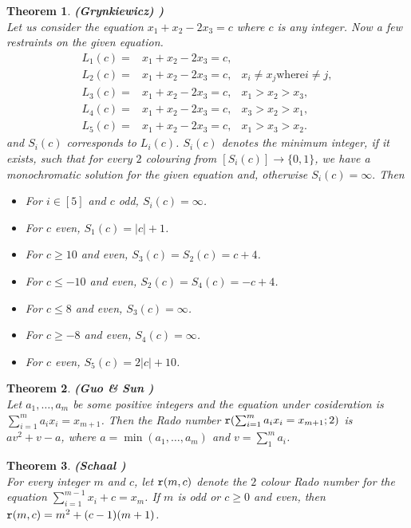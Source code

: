 \documentclass[12pt]{report}
\newtheorem{thm}{Theorem}[chapter]
\begin{document}
\begin{thm}{\bf (Grynkiewicz) {\cite{DJG}})} \\[5pt]
Let us consider the equation $x_1+x_2-2x_3=c$ where $c$ is any integer. Now a few restraints on the given equation.
\begin{eqnarray*}
L_1(c) = & x_1+x_2-2x_3=c, & \\
L_2(c) = & x_1+x_2-2x_3=c, & x_i \neq x_j \text{where} i \neq j,\\
L_3(c) = & x_1+x_2-2x_3=c, & x_1>x_2>x_3, \\
L_4(c) = & x_1+x_2-2x_3=c, & x_3>x_2>x_1, \\
L_5(c) = & x_1+x_2-2x_3=c, & x_1>x_3>x_2.
\end{eqnarray*}
and $S_i(c)$ corresponds to $L_i(c)$. $S_i(c)$ denotes the minimum integer, if it exists, such that for every $2$ colouring from $[S_i(c)]  \rightarrow  \{0,1\}$, we have a monochromatic solution for the given equation and, otherwise $S_i(c)=\infty.$ Then
\begin{itemize}
\item[{\rm (i)}]
For $i \in [5]$ and $c$ odd, $S_i(c)=\infty$.
\item[{\rm (ii)}] 
For $c$ even, $S_1(c)=|c|+1$.
\item[{\rm (iii)}]
For $c \geq 10$ and even, $S_3(c)=S_2(c)=c+4$.
\item[{\rm (iv)}]
For $c \leq -10$ and even, $S_2(c)=S_4(c)=-c+4$.
\item[{\rm (v)}]
For $c \leq 8$ and even, $S_3(c)=\infty$.
\item[{\rm (vi)}]
For $c \geq -8$ and even, $S_4(c)=\infty$.
\item[{\rm (vii)}]
For $c$ even, $S_5(c)=2|c|+10$.
\end{itemize}
\end{thm}

\begin{thm} {\bf (Guo \& Sun {\cite{GS}})} \\[5pt]
Let $a_1,\ldots,a_m$ be some positive integers and the equation under cosideration is $\sum_{i=1}^m a_ix_i=x_{m+1}$. Then the Rado number ${\tt{r}}(\sum_{i=1}^m a_ix_i=x_{m+1};2)$ is $av^2+v-a$, where $a=\min(a_1,\ldots,a_m)$ and $v=\sum_1^m a_i$. 
\end{thm}

\begin{thm} {\bf (Schaal {\cite{DS}})} \\[5pt]
For every integer $m$ and $c$, let ${\tt{r}}(m,c)$ denote the $2$ colour Rado number for the equation $\sum_{i=1}^{m-1} x_i + c=x_m$. If $m$ is odd or $c \geq 0$ and even, then ${\tt{r}}(m,c)=m^2+(c-1)(m+1)$.
\end{thm}
\end{document}
